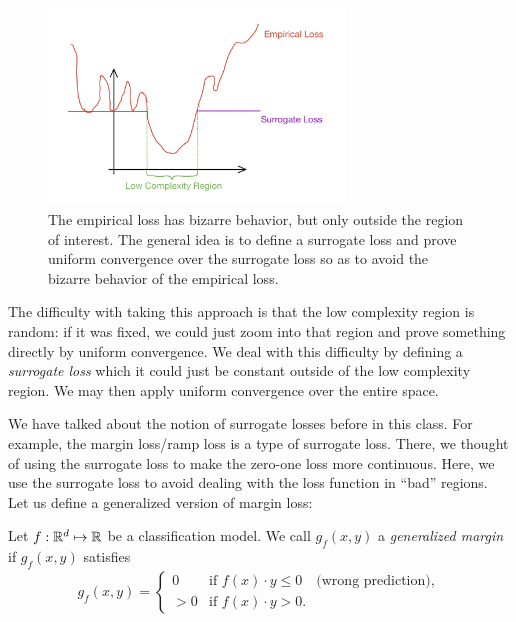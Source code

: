 \begin{figure}[htpb]
    \centering
    \includegraphics[width=0.7\textwidth]{figures/surrogate_loss.jpg}
    \caption{The empirical loss has bizarre behavior, but only outside the region of interest. The general idea is to define a surrogate loss and prove uniform convergence over the surrogate loss so as to avoid the bizarre behavior of the empirical loss.}
    \label{lec18:fig:surrogate_loss}
\end{figure}

The difficulty with taking this approach is that the low complexity region is random: if it was fixed, we could just zoom into that region and prove something directly by uniform convergence. We deal with this difficulty by defining a \textit{surrogate loss} which it could just be constant outside of the low complexity region. We may then apply uniform convergence over the entire space.

We have talked about the notion of surrogate losses before in this class. For example, the margin loss/ramp loss is a type of surrogate loss. There, we thought of using the surrogate loss to make the zero-one loss more continuous. Here, we use the surrogate loss to avoid dealing with the loss function in ``bad'' regions. Let us define a generalized version of margin loss:

\begin{definition}
Let $f : \mathbb R^d \mapsto \mathbb R$ be a classification model. We call $g_f(x, y)$ a \textit{generalized margin} if $g_f(x,y)$ satisfies
\begin{align}
    g_f(x, y) = \begin{cases} 0 &\text{if } f(x)\cdot y \le 0 \quad \text{(wrong prediction)}, \\  > 0 &\text{if } f(x)\cdot y > 0. \end{cases}
\end{align}
\end{definition}

